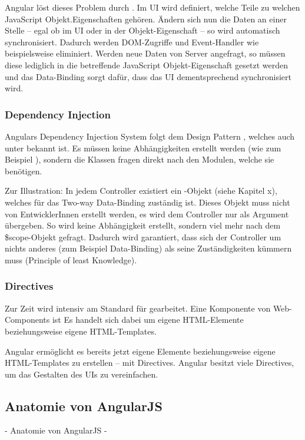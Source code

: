 Angular löst dieses Problem durch . Im UI wird definiert, welche Teile zu welchen JavaScript Objekt.Eigenschaften gehören. Ändern sich nun die Daten an einer Stelle -- egal ob im UI oder in der Objekt-Eigenschaft -- so wird automatisch synchronisiert. Dadurch werden DOM-Zugriffe und Event-Handler wie beispielsweise  eliminiert. Werden neue Daten von Server angefragt, so müssen diese lediglich in die betreffende JavaScript Objekt-Eigenschaft gesetzt werden und das Data-Binding sorgt dafür, dass das UI dementsprechend synchronisiert wird.

\subsubsection{Dependency Injection}
Angulars Dependency Injection System folgt dem Design Pattern , welches auch unter  bekannt ist. Es müssen keine Abhängigkeiten erstellt werden (wie zum Beispiel ), sondern die Klassen fragen direkt nach den Modulen, welche sie benötigen.

Zur Illustration: In jedem Controller existiert ein -Objekt (siehe Kapitel x), welches für das Two-way Data-Binding zuständig ist. Dieses Objekt muss nicht von EntwicklerInnen erstellt werden, es wird dem Controller nur als Argument übergeben. So wird keine Abhängigkeit erstellt, sondern viel mehr nach dem \$scope-Objekt gefragt. Dadurch wird garantiert, dass sich der Controller um nichts anderes (zum Beispiel Data-Binding) als seine Zuständigkeiten kümmern muss (Principle of least Knowledge).

\subsubsection{Directives}
Zur Zeit wird intensiv am Standard für  gearbeitet. Eine Komponente von Web-Components ist  Es handelt sich dabei um eigene HTML-Elemente beziehungsweise eigene HTML-Templates.

Angular ermöglicht es bereits jetzt eigene Elemente beziehungsweise eigene HTML-Templates zu erstellen -- mit Directives. Angular besitzt viele Directives, um das Gestalten des UIs zu vereinfachen.

\subsection{Anatomie von AngularJS}
 - Anatomie von AngularJS -
